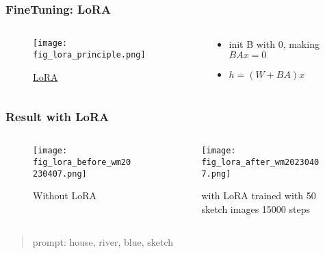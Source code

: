 \documentclass[10pt, hyperref={colorlinks=true,linkcolor=blue},xcolor=dvipsnames]{beamer}
\begin{document}
\begin{frame}
    \frametitle{FineTuning: LoRA}
    \begin{columns}[c] %
        \begin{column}{0.3\textwidth} %
            \begin{figure}
                \texttt{[image: fig\_lora\_principle.png]}
                \caption{\href{http://arxiv.org/abs/2106.09685}{LoRA}}
            \end{figure}
        \end{column}
        \begin{column}{0.68\textwidth} %
            \begin{itemize}
                \item init B with 0, making $BAx = 0$
                \item $h = (W+BA)x$
            \end{itemize}
        \end{column}
    \end{columns}
\end{frame}

\begin{frame}
    \frametitle{Result with LoRA}

    \begin{columns}[c] %
        \begin{column}{0.48\textwidth} %
            \begin{figure}
                \texttt{[image: fig\_lora\_before\_wm20230407.png]}
                \caption{Without LoRA}
            \end{figure}
        \end{column}
        \begin{column}{0.48\textwidth} %
            \begin{figure}
                \texttt{[image: fig\_lora\_after\_wm20230407.png]}
                \caption{with LoRA trained with 50 sketch images 15000 steps}
            \end{figure}
        \end{column}
    \end{columns}
    \begin{quote}prompt: house, river, blue, sketch
    \end{quote}
\end{frame}
\end{document}
